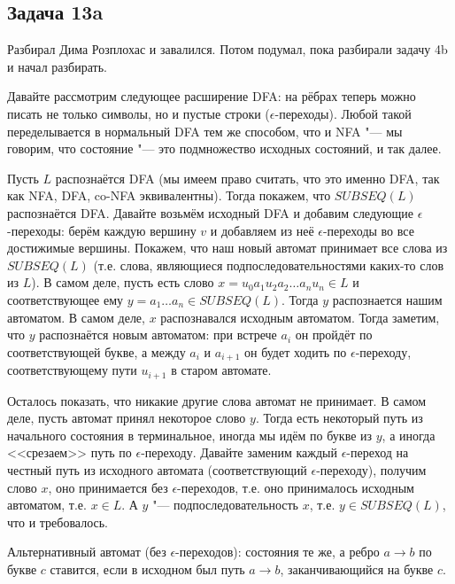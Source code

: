 \subsection{Задача 13a}
	Разбирал Дима Розплохас и завалился.
	Потом подумал, пока разбирали задачу 4b и начал разбирать.

	Давайте рассмотрим следующее расширение DFA: на рёбрах теперь можно писать не только
	символы, но и пустые строки ($\epsilon$-переходы).
	Любой такой переделывается в нормальный DFA тем же способом, что и NFA "--- мы говорим,
	что состояние "--- это подмножество исходных состояний, и так далее.

	Пусть $L$ распознаётся DFA (мы имеем право считать, что это именно DFA, так как NFA, DFA, co-NFA эквивалентны).
	Тогда покажем, что $SUBSEQ(L)$ распознаётся DFA.
	Давайте возьмём исходный DFA и добавим следующие $\epsilon$-переходы:
	берём каждую вершину $v$ и добавляем из неё $\epsilon$-переходы во все достижимые вершины.
	Покажем, что наш новый автомат принимает все слова из $SUBSEQ(L)$
	(т.е. слова, являющиеся подпоследовательностями каких-то слов из $L$).
	В самом деле, пусть есть слово $x=u_0a_1u_2a_2\dots a_nu_n \in L$ и соответствующее
	ему $y = a_1\dots a_n \in SUBSEQ(L)$.
	Тогда $y$ распознается нашим автоматом.
	В самом деле, $x$ распознавался исходным автоматом.
	Тогда заметим, что $y$ распознаётся новым автоматом: при встрече $a_i$ он пройдёт по соответствующей букве,
	а между $a_i$ и $a_{i+1}$ он будет ходить по $\epsilon$-переходу, соответствующему пути $u_{i+1}$
	в старом автомате.

	Осталось показать, что никакие другие слова автомат не принимает.
	В самом деле, пусть автомат принял некоторое слово $y$.
	Тогда есть некоторый путь из начального состояния в терминальное, иногда мы идём по букве
	из $y$, а иногда <<срезаем>> путь по $\epsilon$-переходу.
	Давайте заменим каждый $\epsilon$-переход на честный путь из исходного автомата (соответствующий $\epsilon$-переходу),
	получим	слово $x$, оно принимается без $\epsilon$-переходов, т.е. оно принималось исходным автоматом, т.е. $x \in L$.
	А $y$ "--- подпоследовательность $x$, т.е. $y \in SUBSEQ(L)$, что и требовалось.

	\begin{Rem}
		Альтернативный автомат (без $\epsilon$-переходов): состояния те же,
		а ребро $a\to b$ по букве $c$ ставится, если в исходном был путь $a \to b$,
		заканчивающийся на букве $c$.
	\end{Rem}


